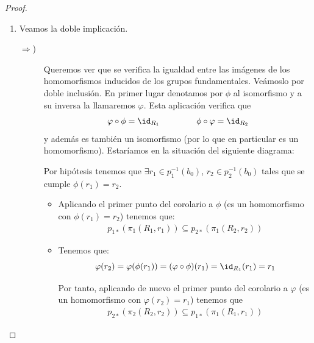 \begin{coro}
\begin{proof}
\begin{enumerate}
            \item Veamos la doble implicación. 
            \begin{description}
                \item[$\Longrightarrow$)] Queremos ver que se verifica la igualdad entre las imágenes de los homomorfismos inducidos de los grupos fundamentales. Veámoslo por doble inclusión. En primer lugar denotamos por $\phi$ al isomorfismo y a su inversa la llamaremos $\varphi$. Esta aplicación verifica  que
                \begin{gather*}
                    \varphi \circ \phi = \id_{R_1} \qquad\qquad \ \phi \circ \varphi = \id_{R_2}
                \end{gather*}
                y además es también un isomorfismo (por lo que en particular es un homomorfismo). Estaríamos en la situación del siguiente diagrama:
                \begin{center}
                \end{center}
                
                Por hipótesis tenemos que $\exists r_1\in p_1^{-1}(b_0)$, $r_2\in p_2^{-1}(b_0)$ tales que se cumple $\phi(r_1)=r_2$.
                \begin{itemize}
                    \item Aplicando el primer punto del corolario a $\phi$ (es un homomorfismo con $\phi(r_1)=r_2$) tenemos que: 
                    \begin{gather*}
                        p_{1*}(\pi_1(R_1,r_1)) \subseteq p_{2*}(\pi_1(R_2,r_2))
                    \end{gather*}
                    \item Tenemos que:
                    \begin{equation*}
                        \varphi(r_2) = \varphi(\phi(r_1)) = (\varphi \circ \phi)(r_1) = \id_{R_1}(r_1) = r_1
                    \end{equation*}
                    
                    Por tanto, aplicando de nuevo el primer punto del corolario a $\varphi$ (es un homomorfismo con $\varphi(r_2)=r_1$) tenemos que 
                    \begin{gather*}
                        p_{2*}(\pi_2(R_2,r_2)) \subseteq p_{1*}(\pi_1(R_1,r_1))
                    \end{gather*}
                \end{itemize}
                

\end{description}
\end{enumerate}
\end{proof}
\end{coro}

